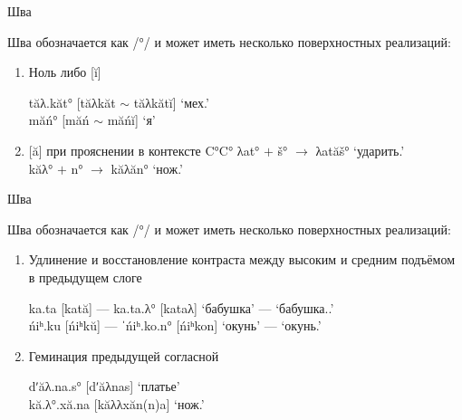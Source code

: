 \documentclass[10 pt, handout]{beamer}
\begin{document}
\begin{frame}{Шва} 

	Шва обозначается как /°/ и может иметь несколько поверхностных реализаций:
	\vspace*{1em}

	\begin{enumerate}[\ding{246}]
		\item Ноль либо [ĭ]
		
	\ex	tăλ.kăt° [tăλkăt $\sim$ tăλkătĭ] \hfill `мех.{\Abl}'\\
		măń° [măń $\sim$ măńĭ]  \hfill `я'
	\xe
		
		\item {[ă]} при прояснении в контексте C°C°
	\ex	λat° $+$ š° $\rightarrow$ λatăš° \hfill `ударить.{\Cvb}'\\
		kăλ° $+$ n° $\rightarrow$ kăλăn° \hfill `нож.{\Dat}'
	\xe
		
	\end{enumerate}

\end{frame}

\begin{frame}{Шва} 

	Шва обозначается как /°/ и может иметь несколько поверхностных реализаций:
	\vspace*{1em}

	\begin{enumerate}[\ding{117}]
		\item Удлинение и восстановление контраста между высоким и средним подъёмом в предыдущем слоге	

	\ex	ka.ta [kată] --- ka.ta.λ° [kataλ] \hfill `бабушка' --- `бабушка.{\Poss}.{\Ssg}'\\
		ńiʰ.ku [ńiʰkŭ] --- ˈńiʰ.ko.n° [ńiʰkon] \hfill `окунь' --- `окунь.{\Dat}' 
	\xe
		
		\item Геминация предыдущей согласной
			
	\ex dʹăλ.na.s° [dʹăλnas] \hfill `платье'\\
		kă.λ°.xă.na [kăλλxăn(n)a] \hfill `нож.{\Loc}'
	\xe
	\end{enumerate}

\end{frame}
\end{document}
